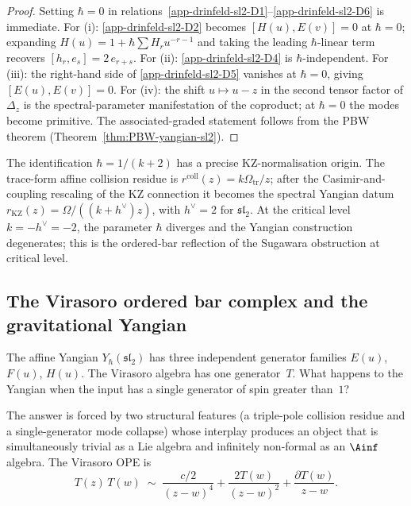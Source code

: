 \begin{proof}
Setting $\hbar = 0$ in relations~\ref{app-drinfeld-sl2-D1}--\ref{app-drinfeld-sl2-D6} is immediate.
For (i): \ref{app-drinfeld-sl2-D2} becomes $[H(u),E(v)] = 0$ at $\hbar = 0$;
expanding $H(u) = 1 + \hbar\sum H_r u^{-r-1}$ and taking
the leading $\hbar$-linear term recovers
$[h_r, e_s] = 2\,e_{r+s}$.
For (ii): \ref{app-drinfeld-sl2-D4} is $\hbar$-independent.
For (iii): the right-hand side of \ref{app-drinfeld-sl2-D5} vanishes at $\hbar = 0$,
giving $[E(u),E(v)] = 0$.
For (iv): the shift $u \mapsto u - z$ in the second tensor factor of
$\Delta_z$ is the spectral-parameter manifestation of the coproduct;
at $\hbar = 0$ the modes become primitive.
The associated-graded statement follows from the PBW theorem
(Theorem~\ref{thm:PBW-yangian-sl2}).
\end{proof}

\begin{remark}
\label{rem:hbar-level}
The identification $\hbar = 1/(k+2)$ has a precise KZ-normalisation
origin. The trace-form affine collision residue is
$r^{\mathrm{coll}}(z)=k\Omega_{\mathrm{tr}}/z$; after the
Casimir-and-coupling rescaling of the KZ connection it becomes the
spectral Yangian datum $r_{\mathrm{KZ}}(z)=\Omega/((k+h^\vee)z)$,
with $h^\vee = 2$ for $\mathfrak{sl}_2$.
At the critical level $k = -h^\vee = -2$, the parameter $\hbar$
diverges and the Yangian construction degenerates; this is the
ordered-bar reflection of the Sugawara obstruction at critical level.
\end{remark}

\subsection{The Virasoro ordered bar complex and the gravitational Yangian}
\label{subsec:virasoro-ordered-bar}

The affine Yangian $Y_\hbar(\mathfrak{sl}_2)$ has three independent
generator families $E(u)$, $F(u)$, $H(u)$. The Virasoro algebra has
one generator~$T$. What happens to the Yangian when the input has a
single generator of spin greater than~$1$?

The answer is forced by two structural features (a triple-pole
collision residue and a single-generator mode collapse) whose
interplay produces an object that is simultaneously trivial as a
Lie algebra and infinitely non-formal as an $\Ainf$ algebra.
The Virasoro OPE is
\begin{equation}\label{eq:virasoro-ope-ordered}
T(z)\,T(w) \;\sim\;
\frac{c/2}{(z-w)^4}
+ \frac{2T(w)}{(z-w)^2}
+ \frac{\partial T(w)}{z-w}.
\end{equation}

